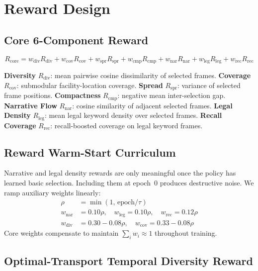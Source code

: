 \documentclass[letterpaper]{article}
\begin{document}
\section{Reward Design}

\subsection{Core 6-Component Reward}

\begin{equation}
R_{\text{core}} = w_{\text{div}}R_{\text{div}} + w_{\text{cov}}R_{\text{cov}} +
w_{\text{spr}}R_{\text{spr}} + w_{\text{cmp}}R_{\text{cmp}} +
w_{\text{nar}}R_{\text{nar}} + w_{\text{leg}}R_{\text{leg}} +
w_{\text{rec}}R_{\text{rec}}
\end{equation}

\noindent\textbf{Diversity} $R_{\text{div}}$: mean pairwise cosine dissimilarity of selected frames.
\textbf{Coverage} $R_{\text{cov}}$: submodular facility-location coverage.
\textbf{Spread} $R_{\text{spr}}$: variance of selected frame positions.
\textbf{Compactness} $R_{\text{cmp}}$: negative mean inter-selection gap.
\textbf{Narrative Flow} $R_{\text{nar}}$: cosine similarity of adjacent selected frames.
\textbf{Legal Density} $R_{\text{leg}}$: mean legal keyword density over selected frames.
\textbf{Recall Coverage} $R_{\text{rec}}$: recall-boosted coverage on legal keyword frames.

\subsection{Reward Warm-Start Curriculum}

Narrative and legal density rewards are only meaningful once the policy has
learned basic selection. Including them at epoch~0 produces destructive noise.
We ramp auxiliary weights linearly:
\begin{align}
\rho &= \min(1,\, \text{epoch}/\tau) \\
w_{\text{nar}} &= 0.10\rho, \quad w_{\text{leg}} = 0.10\rho, \quad w_{\text{rec}} = 0.12\rho \\
w_{\text{div}} &= 0.30 - 0.08\rho, \quad w_{\text{cov}} = 0.33 - 0.08\rho
\end{align}
Core weights compensate to maintain $\sum_i w_i \approx 1$ throughout training.

\subsection{Optimal-Transport Temporal Diversity Reward}
\end{document}
